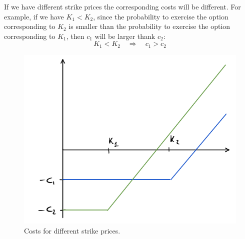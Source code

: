\newline If we have different strike prices the corresponding costs will be different. For example, if we have $K_1<K_2$, since the probability to exercise the option corresponding to $K_2$ is smaller than the probability to exercise the option corresponding to $K_1$, then $c_1$ will be larger thank $c_2$:
\begin{equation*}
    K_1 < K_2 \quad\Rightarrow\quad c_1 > c_2
\end{equation*}
\begin{figure}[h]
    \centering
    \includegraphics[scale=0.2]{fig/tmp/fig3}
    \caption{Costs for different strike prices.}
    \label{fig:figura3}
\end{figure}

